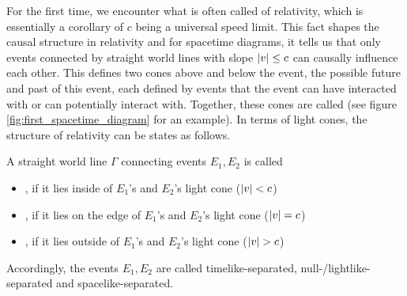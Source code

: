 For the first time, we encounter what is often called  of relativity, which is essentially a corollary of $c$ being a universal speed limit. This fact shapes the causal structure in relativity and for spacetime diagrams, it tells us that only events connected by straight world lines with slope $\abs{v} \leq c$ can causally influence each other. This defines two cones above and below the event, the possible future and past of this event, each defined by events that the event can have interacted with or can potentially interact with. Together, these cones are called  (see figure \ref{fig:first_spacetime_diagram} for an example). In terms of light cones, the structure of relativity can be states as follows.
\begin{defi}\label{defi:causality_v1}
	A straight world line $\Gamma$ connecting events $E_1, E_2$ is called
	\begin{itemize}
		\item {}, if it lies inside of $E_1$'s and $E_2$'s light cone ($\abs{v} < c$)
		
		
		\item {}, if it lies on the edge of $E_1$'s and $E_2$'s light cone ($\abs{v} = c$)
		
		
		\item {}, if it lies outside of $E_1$'s and $E_2$'s light cone ($\abs{v} > c$)
	\end{itemize}
\end{defi}
Accordingly, the events $E_1, E_2$ are called timelike-separated, null-/lightlike-separated and spacelike-separated.




